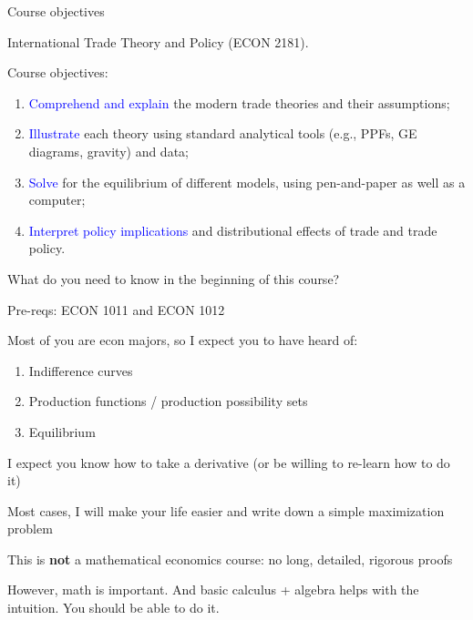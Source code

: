 \documentclass[notes,11pt, aspectratio=169, xcolor=table]{beamer}
\newcommand{\blue}[1]{\textcolor{blue}{#1}}
\newenvironment{wideitemize}{\itemize\addtolength{\itemsep}{10pt}}{\enditemize}
\begin{document}
\begin{frame}{Course objectives}
\begin{wideitemize}
\item International Trade Theory and Policy (ECON 2181).
\item Course objectives:
    \begin{enumerate}
        \item \blue{Comprehend and explain} the modern trade theories and their assumptions;
        \item \blue{Illustrate} each theory using standard analytical tools (e.g., PPFs, GE diagrams, gravity) and data;
        \item \blue{Solve} for the equilibrium of different models, using pen-and-paper as well as a computer;
        \item \blue{Interpret policy implications} and distributional effects of trade and trade policy.
    \end{enumerate}

\end{wideitemize}    
\end{frame}

\begin{frame}{What do you need to know in the beginning of this course?}

\begin{wideitemize}
        \item Pre-reqs: ECON 1011 and ECON 1012
        \item Most of you are econ majors, so I expect you to have heard of:
        \begin{enumerate}
            \item Indifference curves
            \item Production functions / production possibility sets
            \item Equilibrium
        \end{enumerate}
        \item<2-> I expect you know how to take a derivative (or be willing to re-learn how to do it)
        \item<3-> Most cases, I will make your life easier and write down a simple maximization problem
        \item<4-> This is \textbf{not} a mathematical economics course: no long, detailed, rigorous proofs

        \item<5-> However, math is important. And basic calculus + algebra helps with the intuition. You should be able to do it.

\end{wideitemize}
    
\end{frame}
\end{document}
